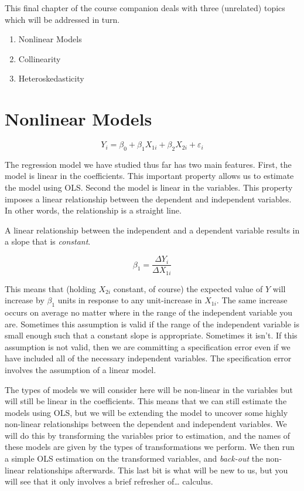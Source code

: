 \documentclass[
]{book}
\begin{document}
This final chapter of the course companion deals with three (unrelated) topics which will be addressed in turn.

\begin{enumerate}
\def\labelenumi{\arabic{enumi}.}
\item
  Nonlinear Models
\item
  Collinearity
\item
  Heteroskedasticity
\end{enumerate}

\hypertarget{nonlinear-models}{%
\section{Nonlinear Models}\label{nonlinear-models}}

\[Y_i = \beta_0 + \beta_1 X_{1i} + \beta_2 X_{2i} + \varepsilon_i\]

The regression model we have studied thus far has two main features. First, the model is linear in the coefficients. This important property allows us to estimate the model using OLS. Second the model is linear in the variables. This property imposes a linear relationship between the dependent and independent variables. In other words, the relationship is a straight line.

A linear relationship between the independent and a dependent variable results in a slope that is \emph{constant}.

\[\beta_1 = \frac{\Delta Y_i}{\Delta X_{1i}}\]

This means that (holding \(X_{2i}\) constant, of course) the expected value of \(Y\) will increase by \(\beta_1\) units in response to any unit-increase in \(X_{1i}\). The same increase occurs on average no matter where in the range of the independent variable you are. Sometimes this assumption is valid if the range of the independent variable is small enough such that a constant slope is appropriate. Sometimes it isn't. If this assumption is not valid, then we are committing a specification error even if we have included all of the necessary independent variables. The specification error involves the assumption of a linear model.

The types of models we will consider here will be non-linear in the variables but will still be linear in the coefficients. This means that we can still estimate the models using OLS, but we will be extending the model to uncover some highly non-linear relationships between the dependent and independent variables. We will do this by transforming the variables prior to estimation, and the names of these models are given by the types of transformations we perform. We then run a simple OLS estimation on the transformed variables, and \emph{back-out} the non-linear relationships afterwards. This last bit is what will be new to us, but you will see that it only involves a brief refresher of\ldots{} calculus.
\end{document}
